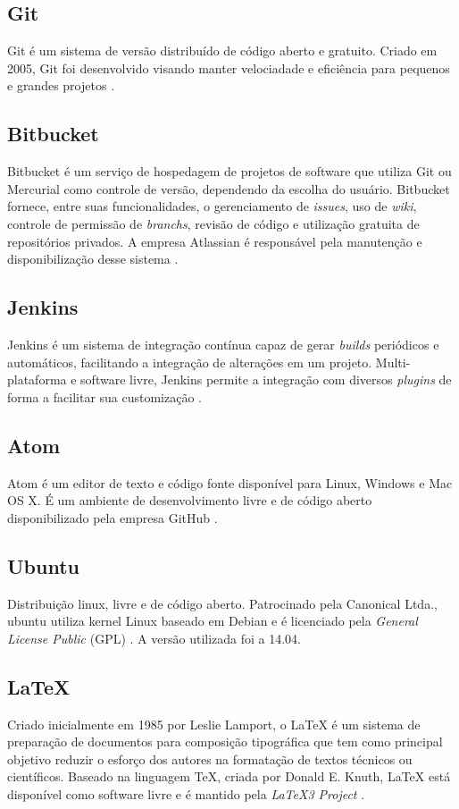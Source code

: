 \subsection{Git}
Git é um sistema de versão distribuído de código aberto e gratuito. Criado em 2005, Git foi desenvolvido visando manter velociadade e eficiência para pequenos e grandes projetos \cite{git2015}. 

\subsection{Bitbucket}
Bitbucket é um serviço de hospedagem de projetos de software que utiliza Git ou Mercurial como controle de versão, dependendo da escolha do usuário. Bitbucket fornece, entre suas funcionalidades, o gerenciamento de \textit{issues}, uso de \textit{wiki}, controle de permissão de \textit{branchs}, revisão de código e utilização gratuita de repositórios privados. A empresa Atlassian é responsável pela manutenção e disponibilização desse sistema \cite{bitbucket2008}.

\subsection{Jenkins}
Jenkins é um sistema de integração contínua capaz de gerar \textit{builds} periódicos e automáticos, facilitando a integração de alterações em um projeto. Multi-plataforma e software livre, Jenkins permite a integração com diversos \textit{plugins} de forma a facilitar sua customização \cite{jenkins2015}.

\subsection{Atom}
Atom é um editor de texto e código fonte disponível para Linux, Windows e Mac OS X. É um ambiente de desenvolvimento livre e de código aberto disponibilizado pela empresa GitHub \cite{atom2015}. 

\subsection{Ubuntu}
Distribuição linux, livre e de código aberto. Patrocinado pela Canonical Ltda., ubuntu utiliza kernel Linux baseado em Debian e é licenciado pela \textit{General License Public} (GPL) \cite{ubuntu2010}. A versão utilizada foi a 14.04.  

\subsection{LaTeX}
Criado inicialmente em 1985 por Leslie Lamport, o LaTeX é um sistema de preparação de documentos para composição tipográfica que tem como principal objetivo reduzir o esforço dos autores na formatação de textos técnicos ou científicos. Baseado na linguagem TeX, criada por Donald E. Knuth, LaTeX está disponível como software livre e é mantido pela \textit{LaTeX3 Project} \cite{latex2015}.

